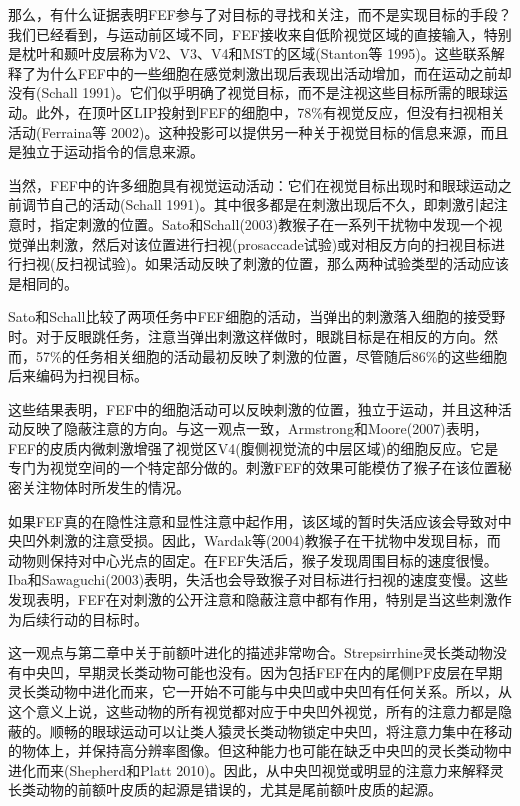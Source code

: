 那么，有什么证据表明FEF参与了对目标的寻找和关注，而不是实现目标的手段？我们已经看到，与运动前区域不同，FEF接收来自低阶视觉区域的直接输入，特别是枕叶和颞叶皮层称为V2、V3、V4和MST的区域(Stanton等 1995)。这些联系解释了为什么FEF中的一些细胞在感觉刺激出现后表现出活动增加，而在运动之前却没有(Schall 1991)。它们似乎明确了视觉目标，而不是注视这些目标所需的眼球运动。此外，在顶叶区LIP投射到FEF的细胞中，78\%有视觉反应，但没有扫视相关活动(Ferraina等 2002)。这种投影可以提供另一种关于视觉目标的信息来源，而且是独立于运动指令的信息来源。

当然，FEF中的许多细胞具有视觉运动活动：它们在视觉目标出现时和眼球运动之前调节自己的活动(Schall 1991)。其中很多都是在刺激出现后不久，即刺激引起注意时，指定刺激的位置。Sato和Schall(2003)教猴子在一系列干扰物中发现一个视觉弹出刺激，然后对该位置进行扫视(prosaccade试验)或对相反方向的扫视目标进行扫视(反扫视试验)。如果活动反映了刺激的位置，那么两种试验类型的活动应该是相同的。

Sato和Schall比较了两项任务中FEF细胞的活动，当弹出的刺激落入细胞的接受野时。对于反眼跳任务，注意当弹出刺激这样做时，眼跳目标是在相反的方向。然而，57\%的任务相关细胞的活动最初反映了刺激的位置，尽管随后86\%的这些细胞后来编码为扫视目标。

这些结果表明，FEF中的细胞活动可以反映刺激的位置，独立于运动，并且这种活动反映了隐蔽注意的方向。与这一观点一致，Armstrong和Moore(2007)表明，FEF的皮质内微刺激增强了视觉区V4(腹侧视觉流的中层区域)的细胞反应。它是专门为视觉空间的一个特定部分做的。刺激FEF的效果可能模仿了猴子在该位置秘密关注物体时所发生的情况。

如果FEF真的在隐性注意和显性注意中起作用，该区域的暂时失活应该会导致对中央凹外刺激的注意受损。因此，Wardak等(2004)教猴子在干扰物中发现目标，而动物则保持对中心光点的固定。在FEF失活后，猴子发现周围目标的速度很慢。Iba和Sawaguchi(2003)表明，失活也会导致猴子对目标进行扫视的速度变慢。这些发现表明，FEF在对刺激的公开注意和隐蔽注意中都有作用，特别是当这些刺激作为后续行动的目标时。

这一观点与第二章中关于前额叶进化的描述非常吻合。Strepsirrhine灵长类动物没有中央凹，早期灵长类动物可能也没有。因为包括FEF在内的尾侧PF皮层在早期灵长类动物中进化而来，它一开始不可能与中央凹或中央凹有任何关系。所以，从这个意义上说，这些动物的所有视觉都对应于中央凹外视觉，所有的注意力都是隐蔽的。顺畅的眼球运动可以让类人猿灵长类动物锁定中央凹，将注意力集中在移动的物体上，并保持高分辨率图像。但这种能力也可能在缺乏中央凹的灵长类动物中进化而来(Shepherd和Platt 2010)。因此，从中央凹视觉或明显的注意力来解释灵长类动物的前额叶皮质的起源是错误的，尤其是尾前额叶皮质的起源。


